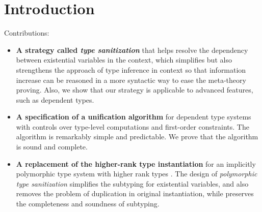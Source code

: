 \section{Introduction}

Contributions:

\begin{itemize}
\item \textbf{A strategy called \textit{type sanitization}} that helps resolve
  the dependency between existential variables in the context, which simplifies
  but also strengthens the approach of type inference in context
  \citep{gundry2010type} so that information increase can be reasoned in a more
  syntactic way to ease the meta-theory proving. Also, we show that our strategy
  is applicable to advanced features, such as dependent types.
\item \textbf{A specification of a unification algorithm} for dependent type
  systems with controls over type-level computations and first-order
  constraints. The algorithm is remarkably simple and predictable. We prove that
  the algorithm is sound and complete.
\item \textbf{A replacement of the higher-rank type instantiation} for an
  implicitly polymorphic type system with higher rank types
  \citep{dunfield2013complete}. The design of \textit{polymorphic type
    sanitization} simplifies the subtyping for existential variables, and also
  removes the problem of duplication in original instantiation, while preserves
  the completeness and soundness of subtyping.
\end{itemize}

